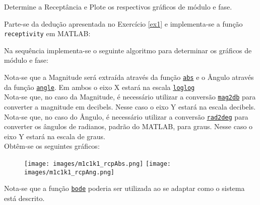 \documentclass{article}
\begin{document}
\newpage
\begin{exercise}\label{ex2}
    Determine a Receptância e Plote os respectivos gráficos de módulo e fase.
\end{exercise}
\begin{resolution}
    Parte-se da dedução apresentada no Exercício \ref{ex1} e implementa-se a função \texttt{receptivity} em MATLAB:
    \begin{scriptsize}
        \myMatlab
    \end{scriptsize}
    Na sequência implementa-se o seguinte algoritmo para determinar os gráficos de módulo e fase:
    \begin{scriptsize}
        \myMatlab
    \end{scriptsize}
    Nota-se que a Magnitude será extraída através da função \href{https://www.mathworks.com/help/matlab/ref/abs.html}{\texttt{abs}} e o Ângulo através da função \href{https://www.mathworks.com/help/matlab/ref/angle.html}{\texttt{angle}}. Em ambos o eixo X estará na escala \href{https://www.mathworks.com/help/matlab/ref/loglog.html}{\texttt{loglog}}\\

    Nota-se que, no caso da Magnitude, é necessário utilizar a conversão \href{https://www.mathworks.com/help/signal/ref/mag2db.html}{\texttt{mag2db}} para converter a magnitude em decibels. Nesse caso o eixo Y estará na escala decibels.\\

    Nota-se que, no caso do Ângulo, é necessário utilizar a conversão \href{https://www.mathworks.com/help/matlab/ref/rad2deg.html}{\texttt{rad2deg}} para converter os ângulos de radianos, padrão do MATLAB, para graus. Nesse caso o eixo Y estará na escala de graus.\\

    \noindent Obtêm-se os seguintes gráficos:
    \begin{figure}[H]
        \centering
        \texttt{[image: images/m1c1k1\_rcpAbs.png]}
        \texttt{[image: images/m1c1k1\_rcpAng.png]}
    \end{figure}
    Nota-se que a função \href{https://www.mathworks.com/help/control/ref/lti.bode.html}{\texttt{bode}} poderia ser utilizada ao se adaptar como o sistema está descrito.
\end{resolution}
\end{document}
